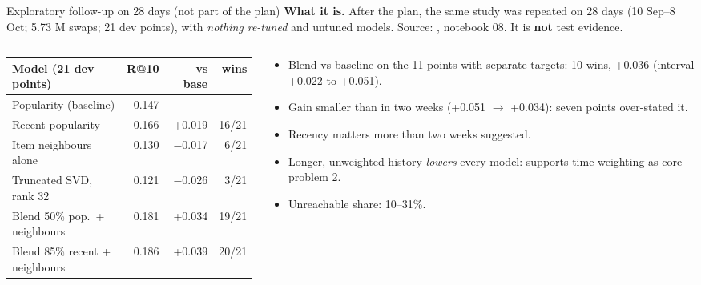 \documentclass[aspectratio=169,10pt]{beamer}
\newcommand{\toindex}{\hfill\hyperlink{index}{\beamerreturnbutton{index}}}
\begin{document}
\begin{frame}[label=explor]{Exploratory follow-up on 28 days (not part of the plan) \toindex}
  \scriptsize
  \textbf{What it is.} After the plan, the same study was repeated on 28 days (10 Sep--8 Oct; 5.73 M swaps; 21 dev points), with \emph{nothing re-tuned} and untuned models. Source: , notebook 08. It is \textbf{not} test evidence.
  \par\medskip
  \begin{columns}[T]
    \begin{column}{0.56\textwidth}
      \renewcommand{\arraystretch}{1.1}
      \begin{tabular}{@{}lrrr@{}}
        \toprule
        Model (21 dev points) & R@10 & vs base & wins \\
        \midrule
        Popularity (baseline) & 0.147 & & \\
        Recent popularity & 0.166 & +0.019 & 16/21 \\
        Item neighbours alone & 0.130 & $-$0.017 & 6/21 \\
        Truncated SVD, rank 32 & 0.121 & $-$0.026 & 3/21 \\
        Blend 50\% pop.\ + neighbours & 0.181 & +0.034 & 19/21 \\
        Blend 85\% recent + neighbours & 0.186 & +0.039 & 20/21 \\
        \bottomrule
      \end{tabular}
    \end{column}
    \begin{column}{0.42\textwidth}
      \begin{itemize}
        \item Blend vs baseline on the 11 points with separate targets: 10 wins, +0.036 (interval +0.022 to +0.051).
        \item Gain smaller than in two weeks (+0.051 $\rightarrow$ +0.034): seven points over-stated it.
        \item Recency matters more than two weeks suggested.
        \item Longer, unweighted history \emph{lowers} every model: supports time weighting as core problem 2.
        \item Unreachable share: 10--31\%.
      \end{itemize}
    \end{column}
  \end{columns}
\end{frame}
\end{document}
